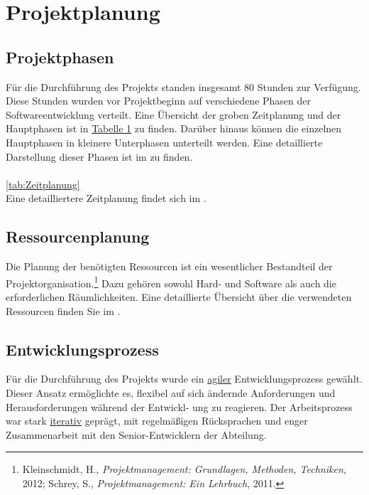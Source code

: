 
\section{Projektplanung} 
\label{sec:Projektplanung}

\subsection{Projektphasen}
\label{sec:Projektphasen}

Für die Durchführung des Projekts standen insgesamt 80 Stunden zur Verfügung. Diese Stunden wurden vor Projektbeginn auf verschiedene Phasen der Softwareentwicklung verteilt. Eine Übersicht der groben Zeitplanung und der Hauptphasen ist in
\hyperref[tab:Zeitplanung]{\textcolor{AOBlau}{Tabelle 1}} zu finden. Darüber hinaus können die einzelnen Hauptphasen in kleinere Unterphasen unterteilt werden. Eine detaillierte Darstellung dieser Phasen ist im  zu finden.

\paragraph{}
\ref{tab:Zeitplanung}
\\
Eine detailliertere Zeitplanung findet sich im .

\subsection{Ressourcenplanung}
\label{sec:Ressourcenplanung}

Die Planung der benötigten Ressourcen ist ein wesentlicher Bestandteil der Projektorganisation.\footnote{Kleinschmidt, H., \textit{Projektmanagement: Grundlagen, Methoden, Techniken}, 2012; Schrey, S., \textit{Projektmanagement: Ein Lehrbuch}, 2011.} Dazu gehören sowohl Hard- und Software als auch die erforderlichen Räumlichkeiten. Eine detaillierte Übersicht über die verwendeten Ressourcen finden Sie im . 

\subsection{Entwicklungsprozess}
\label{sec:Entwicklungsprozess}

Für die Durchführung des Projekts wurde ein \hyperlink{agil}{\textcolor{AOBlau}{agiler}} Entwicklungsprozess gewählt. Dieser Ansatz ermöglichte es, flexibel auf sich ändernde Anforderungen und Herausforderungen während der Entwickl-
ung zu reagieren. Der Arbeitsprozess war stark \hyperlink{iterativ}{\textcolor{AOBlau}{iterativ}} geprägt, mit regelmäßigen Rücksprachen und enger Zusammenarbeit mit den Senior-Entwicklern der Abteilung.

